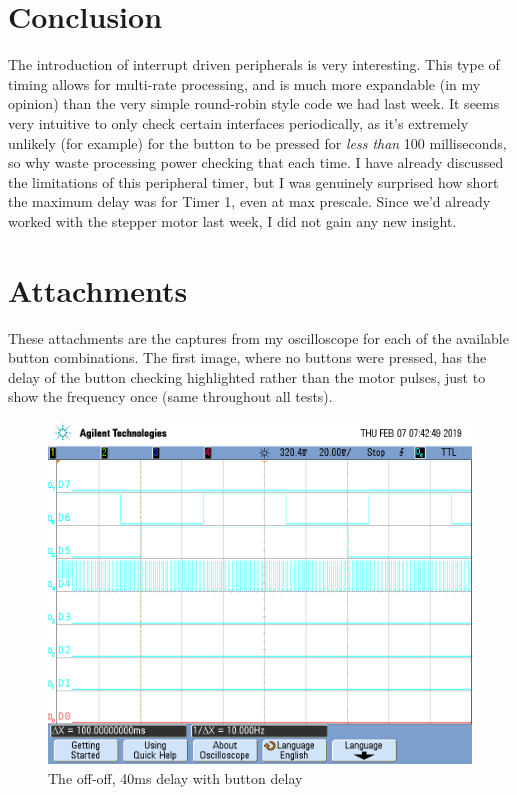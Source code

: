 \documentclass[a4paper, 12pt]{article}
\begin{document}
\section{Conclusion}
The introduction of interrupt driven peripherals is very interesting. This type of timing allows for multi-rate processing, and is much more expandable (in my opinion) than the very simple round-robin style code we had last week. It seems very intuitive to only check certain interfaces periodically, as it's extremely unlikely (for example) for the button to be pressed for \textit{less than} 100 milliseconds, so why waste processing power checking that each time. I have already discussed the limitations of this peripheral timer, but I was genuinely surprised how short the maximum delay was for Timer 1, even at max prescale. Since we'd already worked with the stepper motor last week, I did not gain any new insight.

\section{Attachments}
These attachments are the captures from my oscilloscope for each of the available button combinations. The first image, where no buttons were pressed, has the delay of the button checking highlighted rather than the motor pulses, just to show the frequency once (same throughout all tests). 
\begin{figure}[htb]
\centering
\includegraphics[width=.8\textwidth]{00.png}
\caption{The off-off, 40ms delay with button delay}
\end{figure}
\end{document}
